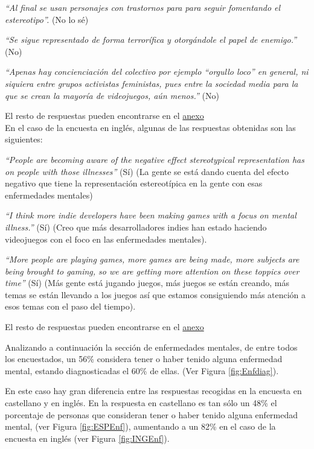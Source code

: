 \documentclass[12pt, a4paper,twoside,titlepage]{book}
\begin{document}
\textit{``Al final se usan personajes con trastornos para para seguir fomentando el estereotipo''.} (No lo sé) 

\textit{``Se sigue representado de forma terrorífica y otorgándole el papel de enemigo.''} (No)

\textit{``Apenas hay concienciación del colectivo por ejemplo ``orgullo loco'' en general, ni siquiera entre grupos activistas feministas, pues entre la sociedad media para la que se crean la mayoría de videojuegos, aún menos.''} (No) 

El resto de respuestas pueden encontrarse en el   \hyperref[mejorCastellano]{anexo}\\


 
En el caso de la encuesta en inglés, algunas de las respuestas obtenidas son las siguientes: 

\textit{``People are becoming aware of the negative effect stereotypical representation has on people with those illnesses''} (Sí) (La gente se está dando cuenta del efecto negativo que tiene la representación estereotípica en la gente con esas enfermedades mentales)

\textit{``I think more indie developers have been making games with a focus on mental illness.''} (Sí) (Creo que más desarrolladores indies han estado haciendo videojuegos con el foco en las enfermedades mentales).

\textit{``More people are playing games, more games are being made, more subjects are being brought to gaming, so we are getting more attention on these toppics over time''} (Sí) (Más gente está jugando juegos, más juegos se están creando, más temas se están llevando a los juegos así que estamos consiguiendo más atención a esos temas con el paso del tiempo).

El resto de respuestas pueden encontrarse en el \hyperref[mejorIngles]{anexo}



Analizando a continuación la sección de enfermedades mentales, de entre todos los encuestados, un 56\% considera tener o haber tenido alguna enfermedad mental, estando diagnosticadas el 60\% de ellas. (Ver Figura \ref{fig:Enfdiag}). 

En este caso hay gran diferencia entre las respuestas recogidas en la encuesta en castellano y en inglés. En la respuesta en castellano es tan sólo un 48\% el porcentaje de personas que consideran tener o haber tenido alguna enfermedad mental, (ver Figura \ref{fig:ESPEnf}), aumentando a un 82\% en el caso de la encuesta en inglés (ver Figura \ref{fig:INGEnf}). 
\end{document}
